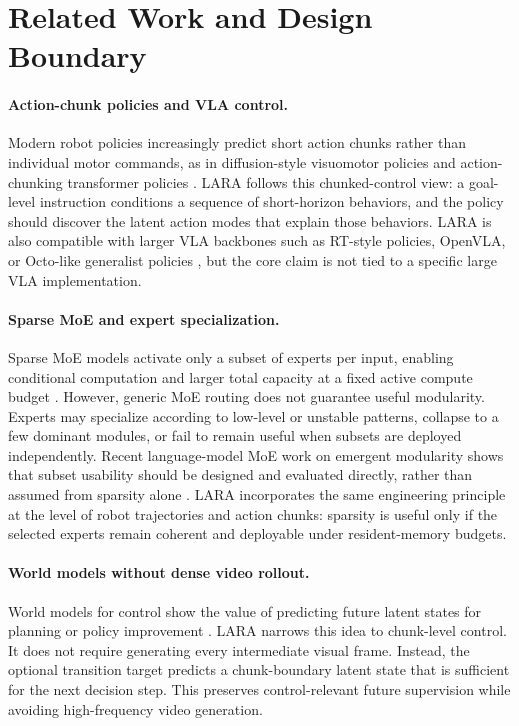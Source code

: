 \documentclass[10pt]{article}
\begin{document}
\section{Related Work and Design Boundary}

\paragraph{Action-chunk policies and VLA control.}
Modern robot policies increasingly predict short action chunks rather than individual motor commands, as in diffusion-style visuomotor policies and action-chunking transformer policies \cite{chi2023diffusion}. LARA follows this chunked-control view: a goal-level instruction conditions a sequence of short-horizon behaviors, and the policy should discover the latent action modes that explain those behaviors. LARA is also compatible with larger VLA backbones such as RT-style policies, OpenVLA, or Octo-like generalist policies \cite{brohan2022rt1,brohan2023rt2,openvla2024,octo2024}, but the core claim is not tied to a specific large VLA implementation.

\paragraph{Sparse MoE and expert specialization.}
Sparse MoE models activate only a subset of experts per input, enabling conditional computation and larger total capacity at a fixed active compute budget \cite{shazeer2017moe,fedus2022switch}. However, generic MoE routing does not guarantee useful modularity. Experts may specialize according to low-level or unstable patterns, collapse to a few dominant modules, or fail to remain useful when subsets are deployed independently. Recent language-model MoE work on emergent modularity shows that subset usability should be designed and evaluated directly, rather than assumed from sparsity alone \cite{wang2026emo}. LARA incorporates the same engineering principle at the level of robot trajectories and action chunks: sparsity is useful only if the selected experts remain coherent and deployable under resident-memory budgets.

\paragraph{World models without dense video rollout.}
World models for control show the value of predicting future latent states for planning or policy improvement \cite{hafner2023dreamer,hansen2024tdmpc2}. LARA narrows this idea to chunk-level control. It does not require generating every intermediate visual frame. Instead, the optional transition target predicts a chunk-boundary latent state that is sufficient for the next decision step. This preserves control-relevant future supervision while avoiding high-frequency video generation.
\end{document}

